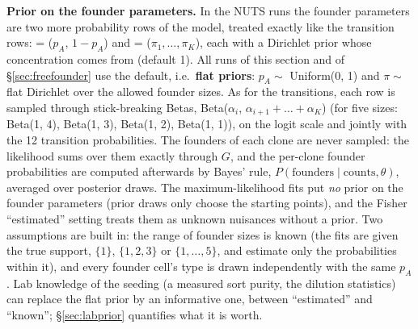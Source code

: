 \documentclass[10pt,a4paper]{article}
\begin{document}
\textbf{Prior on the founder parameters.} In the NUTS runs the founder parameters are two more probability rows of the model, treated exactly like the transition rows:  = ($p_A$, $1-p_A$) and  = ($\pi_1, \dots, \pi_K$), each with a Dirichlet prior whose concentration comes from  (default 1). All runs of this section and of \S\ref{sec:freefounder} use the default, i.e.\ \textbf{flat priors}: $p_A \sim$ Uniform(0, 1) and $\pi \sim$ flat Dirichlet over the allowed founder sizes. As for the transitions, each row is sampled through stick-breaking Betas, Beta($\alpha_i$, $\alpha_{i+1} + \dots + \alpha_K$) (for five sizes: Beta(1, 4), Beta(1, 3), Beta(1, 2), Beta(1, 1)), on the logit scale and jointly with the 12 transition probabilities. The founders of each clone are never sampled: the likelihood sums over them exactly through $G$, and the per-clone founder probabilities are computed afterwards by Bayes' rule, $P(\text{founders} \mid \text{counts}, \theta)$, averaged over posterior draws. The maximum-likelihood fits put \emph{no} prior on the founder parameters (prior draws only choose the starting points), and the Fisher ``estimated'' setting treats them as unknown nuisances without a prior. Two assumptions are built in: the range of founder sizes is known (the fits are given the true support, $\{1\}$, $\{1, 2, 3\}$ or $\{1, \dots, 5\}$, and estimate only the probabilities within it), and every founder cell's type is drawn independently with the same $p_A$. Lab knowledge of the seeding (a measured sort purity, the dilution statistics) can replace the flat prior by an informative one, between ``estimated'' and ``known''; \S\ref{sec:labprior} quantifies what it is worth.
\end{document}
